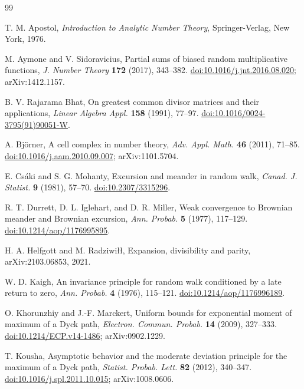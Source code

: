\documentclass[11pt]{amsart}
\numberwithin{equation}{section}
\theoremstyle{plain}
\theoremstyle{definition}
\theoremstyle{remark}
\begin{document}
\begin{thebibliography}{99}

T. M. Apostol,
\emph{Introduction to Analytic Number Theory},
Springer-Verlag, New York, 1976.

M. Aymone and V. Sidoravicius,
Partial sums of biased random multiplicative functions,
\emph{J. Number Theory} \textbf{172} (2017), 343--382.
\href{https://doi.org/10.1016/j.jnt.2016.08.020}{doi:10.1016/j.jnt.2016.08.020};
arXiv:1412.1157.

B. V. Rajarama Bhat,
On greatest common divisor matrices and their applications,
\emph{Linear Algebra Appl.} \textbf{158} (1991), 77--97.
\href{https://doi.org/10.1016/0024-3795(91)90051-W}{doi:10.1016/0024-3795(91)90051-W}.

A. Bj\"orner,
A cell complex in number theory,
\emph{Adv. Appl. Math.} \textbf{46} (2011), 71--85.
\href{https://doi.org/10.1016/j.aam.2010.09.007}{doi:10.1016/j.aam.2010.09.007};
arXiv:1101.5704.

E. Cs\'aki and S. G. Mohanty,
Excursion and meander in random walk,
\emph{Canad. J. Statist.} \textbf{9} (1981), 57--70.
\href{https://doi.org/10.2307/3315296}{doi:10.2307/3315296}.

R. T. Durrett, D. L. Iglehart, and D. R. Miller,
Weak convergence to Brownian meander and Brownian excursion,
\emph{Ann. Probab.} \textbf{5} (1977), 117--129.
\href{https://doi.org/10.1214/aop/1176995895}{doi:10.1214/aop/1176995895}.

H. A. Helfgott and M. Radziwi\l\l,
Expansion, divisibility and parity,
arXiv:2103.06853, 2021.

W. D. Kaigh,
An invariance principle for random walk conditioned by a late return to zero,
\emph{Ann. Probab.} \textbf{4} (1976), 115--121.
\href{https://doi.org/10.1214/aop/1176996189}{doi:10.1214/aop/1176996189}.

O. Khorunzhiy and J.-F. Marckert,
Uniform bounds for exponential moment of maximum of a Dyck path,
\emph{Electron. Commun. Probab.} \textbf{14} (2009), 327--333.
\href{https://doi.org/10.1214/ECP.v14-1486}{doi:10.1214/ECP.v14-1486};
arXiv:0902.1229.

T. Kousha,
Asymptotic behavior and the moderate deviation principle for the maximum of a Dyck path,
\emph{Statist. Probab. Lett.} \textbf{82} (2012), 340--347.
\href{https://doi.org/10.1016/j.spl.2011.10.015}{doi:10.1016/j.spl.2011.10.015};
arXiv:1008.0606.


\end{thebibliography}
\end{document}

